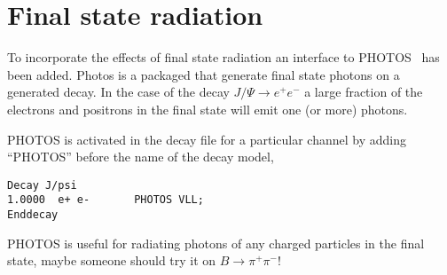 \section{Final state radiation}
\label{sect:finalstaterad}

To incorporate the effects of final state radiation an interface to
PHOTOS~\cite{Was92} has been added. Photos is a packaged that
generate final state photons on a generated decay. In the case of the
decay $J/\Psi\rightarrow e^{+}e^{-}$ a large fraction of the electrons
and positrons in the final state will emit one (or more) photons. 

 PHOTOS is activated in the decay file for a particular channel
by adding ``PHOTOS'' before the name of the decay model,
\begin{verbatim}
Decay J/psi
1.0000  e+ e-       PHOTOS VLL;
Enddecay
\end{verbatim}

PHOTOS is useful for radiating photons of any charged particles in the 
final state, maybe someone should try it on $B\rightarrow \pi^{+}\pi^{-}$!

